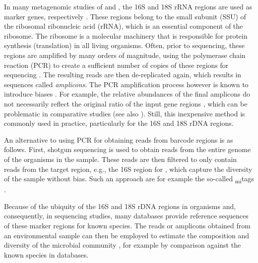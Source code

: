 
In many metagenomic studies of  and ,
the 16S \cite{Weisburg1991} and 18S \cite{Meyer2010} rRNA regions are used as marker genes,
respectively \cite{Woese1977,Woese1990}.
These regions belong to the small subunit (SSU) of the ribosomal ribonucleic acid (rRNA),
which is an essential component of the ribosome.
The ribosome is a molecular machinery that is responsible for protein synthesis (translation) in all living organisms.
Often, prior to sequencing, these regions are amplified by many orders of magnitude,
using the polymerase chain reaction (PCR)
to create a sufficient number of copies of these regions for sequencing \cite{Bartlett2003}.
The resulting reads are then de-replicated again, which results in sequences called \emph{amplicons}.
The PCR amplification process however is known to introduce biases \cite{Logares2014,Brown2017}.
For example, the relative abundances of the final amplicons
do not necessarily reflect the original ratio of the input gene regions \cite{Kanagawa2003},
which can be problematic in comparative studies
(see also ).
Still, this inexpensive method is commonly used in practice, particularly for the 16S and 18S rDNA regions.

An alternative to using PCR for obtaining reads from barcode regions is as follows.
First, shotgun sequencing is used to obtain reads from the entire genome of the organisms in the sample.
These reads are then filtered to only contain reads from the target region, e.g., the 16S region for ,
which capture the diversity of the sample without bias.
Such an approach are for example the so-called \textsubscript{mi}tags \citep{Logares2014}.

Because of the ubiquity of the 16S and 18S rDNA regions in organisms and, consequently, in sequencing studies,
many databases provide reference sequences of these marker regions for known species.
The reads or amplicons obtained from an environmental sample can then be employed
to estimate the composition and diversity of the microbial community \cite{Hugerth2017},
for example by comparison against the known species in databases.

